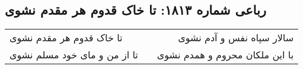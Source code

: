 \begin{center}
\section*{رباعی شماره ۱۸۱۳: تا خاک قدوم هر مقدم نشوی}
\label{sec:1813}
\begin{longtable}{l p{0.5cm} r}
تا خاک قدوم هر مقدم نشوی
&&
سالار سپاه نفس و آدم نشوی
\\
تا از من و مای خود مسلم نشوی
&&
با این ملکان محروم و همدم نشوی
\\
\end{longtable}
\end{center}
